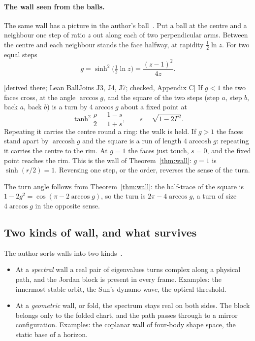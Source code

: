 \documentclass[11pt]{article}
\theoremstyle{definition}\newtheorem{hypothesis}{Hypothesis}\newtheorem{prediction}{Prediction}
\theoremstyle{remark}\newtheorem{remark}[theorem]{Remark}
\newcommand{\grade}[1]{\textsf{\small[#1]}}
\begin{document}
\paragraph{The wall seen from the balls.} The same wall has a picture in the author's ball~\cite{TwoTrees,Mixer}. Put a ball at the centre and a neighbour one step of ratio $z$ out along each of two perpendicular arms. Between the centre and each neighbour stands the face halfway, at rapidity $\tfrac12\ln z$. For two equal steps
\begin{equation}
g=\sinh^2\big(\tfrac12\ln z\big)=\frac{(z-1)^2}{4z}.
\end{equation}
\begin{proposition}\label{prop:turnrun}\grade{derived there; Lean BallJoins J3, J4, J7; checked, Appendix C}
If $g<1$ the two faces cross, at the angle $\arccos g$, and the square of the two steps (step $a$, step $b$, back $a$, back $b$) is a turn by $4\arccos g$ about a fixed point at
\begin{equation}
\tanh^2\frac{\rho}{2}=\frac{1-s}{1+s},\qquad s=\sqrt{1-2\Gamma^2}.
\end{equation}
Repeating it carries the centre round a ring: the walk is held. If $g>1$ the faces stand apart by $\operatorname{arccosh}g$ and the square is a run of length $4\operatorname{arccosh}g$: repeating it carries the centre to the rim. At $g=1$ the faces just touch, $s=0$, and the fixed point reaches the rim. This is the wall of Theorem~\ref{thm:wall}: $g=1$ is $\sinh(r/2)=1$. Reversing one step, or the order, reverses the sense of the turn.
\end{proposition}
The turn angle follows from Theorem~\ref{thm:wall}: the half-trace of the square is $1-2g^2=\cos(\pi-2\arccos g)$, so the turn is $2\pi-4\arccos g$, a turn of size $4\arccos g$ in the opposite sense.

\subsection{Two kinds of wall, and what survives}
The author sorts walls into two kinds~\cite{BH}.
\begin{itemize}[nosep]
\item At a \emph{spectral} wall a real pair of eigenvalues turns complex along a physical path, and the Jordan block is present in every frame. Examples: the innermost stable orbit, the Sun's dynamo wave, the optical threshold.
\item At a \emph{geometric} wall, or fold, the spectrum stays real on both sides. The block belongs only to the folded chart, and the path passes through to a mirror configuration. Examples: the coplanar wall of four-body shape space, the static base of a horizon.
\end{itemize}
\end{document}
